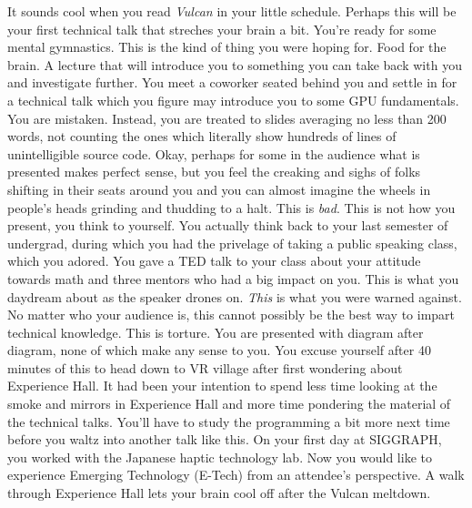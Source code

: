 \documentclass[../main.tex]{subfiles}
\begin{document}
It sounds cool when you read \textit{Vulcan} in your little schedule. Perhaps this will be your first technical talk that streches your brain a bit. You're ready for some mental gymnastics. This is the kind of thing you were hoping for. Food for the brain. A lecture that will introduce you to something you can take back with you and investigate further. You meet a coworker seated behind you and settle in for a technical talk which you figure may introduce you to some GPU fundamentals. You are mistaken. Instead, you are treated to slides averaging no less than 200 words, not counting the ones which literally show hundreds of lines of unintelligible source code. Okay, perhaps for some in the audience what is presented makes perfect sense, but you feel the creaking and sighs of folks shifting in their seats around you and you can almost imagine the wheels in people's heads grinding and thudding to a halt. This is \textit{bad}. This is not how you present, you think to yourself. You actually think back to your last semester of undergrad, during which you had the privelage of taking a public speaking class, which you adored. You gave a TED talk to your class about your attitude towards math and three mentors who had a big impact on you. This is what you daydream about as the speaker drones on. \textit{This} is what you were warned against. No matter who your audience is, this cannot possibly be the best way to impart technical knowledge. This is torture. You are presented with diagram after diagram, none of which make any sense to you. You excuse yourself after 40 minutes of this to head down to VR village after first wondering about Experience Hall. It had been your intention to spend less time looking at the smoke and mirrors in Experience Hall and more time pondering the material of the technical talks. You'll have to study the programming a bit more next time before you waltz into another talk like this. On your first day at SIGGRAPH, you worked with the Japanese haptic technology lab. Now you would like to experience Emerging Technology (E-Tech) from an attendee's perspective. A walk through Experience Hall lets your brain cool off after the Vulcan meltdown.
\end{document}
